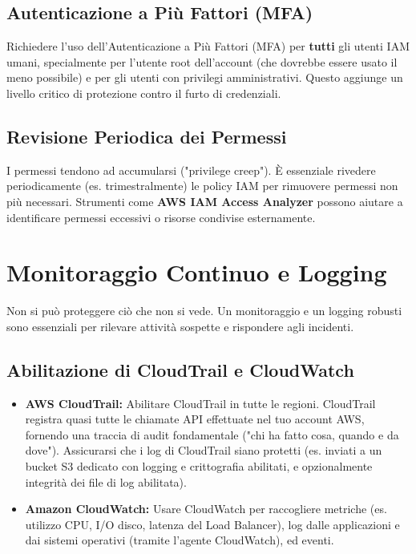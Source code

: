 \subsection{Autenticazione a Più Fattori (MFA)}
\label{subsec:mfa-impl}
Richiedere l'uso dell'Autenticazione a Più Fattori (MFA) per \textbf{tutti} gli utenti IAM umani, specialmente per l'utente root dell'account (che dovrebbe essere usato il meno possibile) e per gli utenti con privilegi amministrativi. Questo aggiunge un livello critico di protezione contro il furto di credenziali.

\subsection{Revisione Periodica dei Permessi}
\label{subsec:iam-review}
I permessi tendono ad accumularsi ("privilege creep"). È essenziale rivedere periodicamente (es. trimestralmente) le policy IAM per rimuovere permessi non più necessari. Strumenti come \textbf{AWS IAM Access Analyzer} possono aiutare a identificare permessi eccessivi o risorse condivise esternamente.

\section{Monitoraggio Continuo e Logging}
\label{sec:monitoring-logging}
Non si può proteggere ciò che non si vede. Un monitoraggio e un logging robusti sono essenziali per rilevare attività sospette e rispondere agli incidenti.

\subsection{Abilitazione di CloudTrail e CloudWatch}
\label{subsec:cloudtrail-cloudwatch-enable}
\begin{itemize}
    \item \textbf{AWS CloudTrail:} Abilitare CloudTrail in tutte le regioni. CloudTrail registra quasi tutte le chiamate API effettuate nel tuo account AWS, fornendo una traccia di audit fondamentale ("chi ha fatto cosa, quando e da dove"). Assicurarsi che i log di CloudTrail siano protetti (es. inviati a un bucket S3 dedicato con logging e crittografia abilitati, e opzionalmente integrità dei file di log abilitata).
    \item \textbf{Amazon CloudWatch:} Usare CloudWatch per raccogliere metriche (es. utilizzo CPU, I/O disco, latenza del Load Balancer), log dalle applicazioni e dai sistemi operativi (tramite l'agente CloudWatch), ed eventi.
\end{itemize}


